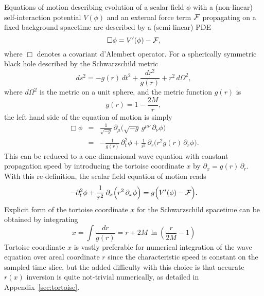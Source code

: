 \documentclass[aps,prd,reprint,twocolumn,groupedaddress]{revtex4-1}
\begin{document}
Equations of motion describing evolution of a scalar field $\phi$ with a (non-linear) self-interaction potential $V(\phi)$ and an external force term ${\cal F}$ propagating on a fixed background spacetime are described by a (semi-linear) PDE
\begin{equation}
  \Box\phi = V'(\phi) - {\cal F},
\end{equation}
where $\Box$ denotes a covariant d'Alembert operator. For a spherically symmetric black hole described by the Schwarzschild metric
\begin{equation}
  ds^2 = -g(r)\, dt^2 + \frac{dr^2}{g(r)} + r^2\, d\Omega^2,
\end{equation}
where $d\Omega^2$ is the metric on a unit sphere, and the metric function $g(r)$ is
\begin{equation}
  g(r) = 1 - \frac{2M}{r},
\end{equation}
the left hand side of the equation of motion is simply
\begin{eqnarray}
  \Box\phi &=& 
  \frac{1}{\sqrt{-g}}\, \partial_\mu \Big( \sqrt{-g}\, g^{\mu\nu}\, \partial_\nu \phi \Big)\nonumber\\ &=&
  - \frac{1}{g(r)}\, \partial_t^2 \phi + \frac{1}{r^2}\, \partial_r \Big( r^2 g(r)\, \partial_r \phi \Big).
\end{eqnarray}
This can be reduced to a one-dimensional wave equation with constant propagation speed by introducing the tortoise coordinate $x$ by $\partial_x = g(r)\, \partial_r$. With this re-definition, the scalar field equation of motion reads
\begin{equation}\label{eq:wave}
  - \partial_t^2 \phi + \frac{1}{r^2}\, \partial_x \Big( r^2\, \partial_x \phi \Big) = g \Big( V'(\phi) - {\cal F} \Big).
\end{equation}
Explicit form of the tortoise coordinate $x$ for the Schwarzschild spacetime can be obtained by integrating
\begin{equation}
  x = \int \frac{dr}{g(r)} = r + 2M\,\ln\left(\frac{r}{2M} - 1\right)
\end{equation}
Tortoise coordinate $x$ is vastly preferable for numerical integration of the wave equation over areal coordinate $r$ since the characteristic speed is constant on the sampled time slice, but the added difficulty with this choice is that accurate $r(x)$ inversion is quite not-trivial numerically, as detailed in Appendix~\ref{sec:tortoise}.
\end{document}
